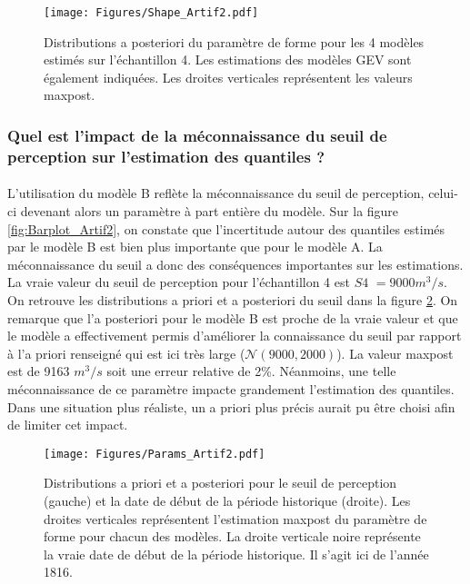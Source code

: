 \documentclass[11pt]{article}
\begin{document}
	\begin{figure}[h]
		\centering
		\texttt{[image: Figures/Shape\_Artif2.pdf]}	
		\caption{Distributions a posteriori du paramètre de forme pour les 4 modèles estimés sur l'échantillon 4. Les estimations des modèles GEV sont également indiquées. Les droites verticales représentent les valeurs maxpost.}
		\label{fig:Shape_Artif2}
	\end{figure}

\FloatBarrier
	
	\subsubsection{Quel est l'impact de la méconnaissance du seuil de perception sur l'estimation des quantiles ?}
	
	\paragraph{} L'utilisation du modèle B reflète la méconnaissance du seuil de perception, celui-ci devenant alors un paramètre à part entière du modèle. Sur la figure \ref{fig:Barplot_Artif2}, on constate que l'incertitude autour des quantiles estimés par le modèle B est bien plus importante que pour le modèle A. La méconnaissance du seuil a donc des conséquences importantes sur les estimations. La vraie valeur du seuil de perception pour l'échantillon 4 est $S4$ $=9000 m^3/s$. On retrouve les distributions a priori et a posteriori du seuil dans la figure \ref{fig:Params_Artif2}. On remarque que l'a posteriori pour le modèle B est proche de la vraie valeur et que le modèle a effectivement permis d'améliorer la connaissance du seuil par rapport à l'a priori renseigné qui est ici très large ($\mathcal{N}(9000,2000)$). La valeur maxpost est de 9163 $m^3/s$ soit une erreur relative de 2\%. Néanmoins, une telle méconnaissance de ce paramètre impacte grandement l'estimation des quantiles. Dans une situation plus réaliste, un a priori plus précis aurait pu être choisi afin de limiter cet impact. 
	
	 \begin{figure}[h]
		\centering
		\texttt{[image: Figures/Params\_Artif2.pdf]}	
		\caption{Distributions a priori et a posteriori pour le seuil de perception (gauche) et la date de début de la période historique (droite). Les droites verticales représentent l'estimation maxpost du paramètre de forme pour chacun des modèles. La droite verticale noire représente la vraie date de début de la période historique. Il s'agit ici de l'année 1816.}
		\label{fig:Params_Artif2}
	\end{figure}
	
\end{document}

